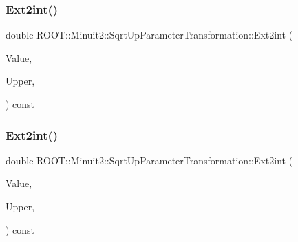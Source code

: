\subsubsection{\texorpdfstring{Ext2int()}{Ext2int()}\hspace{0.1cm}{\footnotesize\ttfamily [2/3]}}
{\footnotesize\ttfamily double R\+O\+O\+T\+::\+Minuit2\+::\+Sqrt\+Up\+Parameter\+Transformation\+::\+Ext2int (\begin{DoxyParamCaption}\item[{double}]{Value,  }\item[{double}]{Upper,  }\item[{const \mbox{\hyperlink{classROOT_1_1Minuit2_1_1MnMachinePrecision}{Mn\+Machine\+Precision}} \&}]{ }\end{DoxyParamCaption}) const}

\mbox{\label{classROOT_1_1Minuit2_1_1SqrtUpParameterTransformation_a8ba129e1707b752df2b477c5e8459958}} 
\subsubsection{\texorpdfstring{Ext2int()}{Ext2int()}\hspace{0.1cm}{\footnotesize\ttfamily [3/3]}}
{\footnotesize\ttfamily double R\+O\+O\+T\+::\+Minuit2\+::\+Sqrt\+Up\+Parameter\+Transformation\+::\+Ext2int (\begin{DoxyParamCaption}\item[{double}]{Value,  }\item[{double}]{Upper,  }\item[{const \mbox{\hyperlink{classROOT_1_1Minuit2_1_1MnMachinePrecision}{Mn\+Machine\+Precision}} \&}]{ }\end{DoxyParamCaption}) const}

